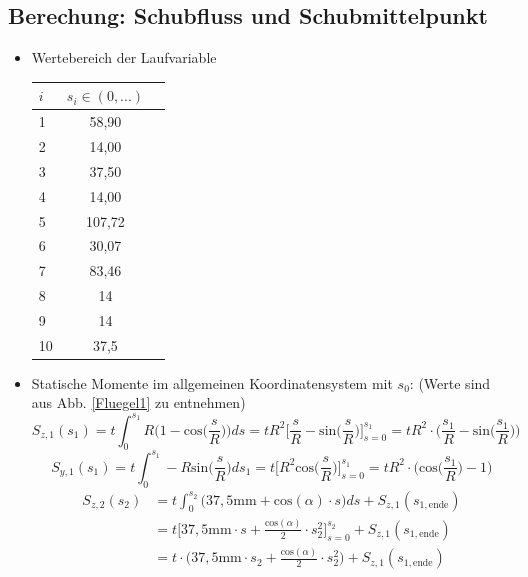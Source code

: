 \subsection{Berechung: Schubfluss und Schubmittelpunkt}\label{SchubRechnung}
\begin{itemize}
	\item Wertebereich der Laufvariable
	\begin{center}
		\begin{tabular}[h]{l|c|c}
			$i$&$s_i\in(0,...)$\\
			\hline
			1&58,90\\
			2&14,00\\
			3&37,50\\
			4&14,00\\
			5&107,72\\
			6&30,07\\
			7&83,46\\
			8&14\\
			9&14\\
			10&37,5\\
		\end{tabular}
	\end{center}
	\item Statische Momente im allgemeinen Koordinatensystem mit $s_0$: (Werte sind aus Abb. \ref{Fluegel1} zu entnehmen)
	\begin{equation}
		S_{z,1}(s_1) = t\int_{0}^{s_1} R\bigg(1-\mathrm{cos}\bigg(\frac{s}{R}\bigg)\bigg)ds = tR^2\bigg[\frac{s}{R} - \mathrm{sin}\bigg(\frac{s}{R}\bigg)\bigg]_{s=0}^{s_1} = tR^2\cdot\bigg(\frac{s_1}{R}-\mathrm{sin}\bigg(\frac{s_1}{R}\bigg)\bigg)
	\end{equation}
	\begin{equation}
		S_{y,1}(s_1) = t\int_{0}^{s_1} -R\mathrm{sin}\bigg(\frac{s}{R}\bigg)ds_1 = t\biggl[ R^2 \mathrm{cos}\bigg(\frac{s}{R}\bigg)\biggr]^{s_1}_{s=0} = tR^2 \cdot\bigg(\mathrm{cos}\bigg(\frac{s_1}{R}\bigg)-1\bigg)
	\end{equation}
\begin{equation}
	\begin{split}
		S_{z,2}(s_2) &= t\int_{0}^{s_2}\bigg(37,5\mathrm{mm}+\mathrm{cos}(\alpha)\cdot s\bigg)ds + S_{z,1}(s_{1,\mathrm{ende}}) \\\
		&= t\bigg[37,5\mathrm{mm}\cdot s +\frac{\mathrm{cos}(\alpha)}{2}\cdot s^2_2\bigg]_{s=0}^{s_2} + S_{z,1}(s_{1,\mathrm{ende}}) \\\ 
		&= t\cdot\bigg(37,5\mathrm{mm}\cdot s_2 +\frac{\mathrm{cos}(\alpha)}{2}\cdot s^2_2\bigg) + S_{z,1}(s_{1,\mathrm{ende}})

\end{split}
\end{equation}
\end{itemize}
